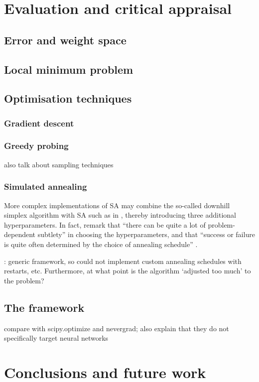 \chapter{Evaluation and critical appraisal}

\section{Error and weight space}

\section{Local minimum problem}

\section{Optimisation techniques}
\subsection{Gradient descent}
\subsection{Greedy probing}
also talk about sampling techniques
\subsection{Simulated annealing}
\label{sec:eval_sim_annealing}
More complex implementations of SA may combine the so-called downhill simplex algorithm \cite{nelder1965} with SA such as in \textcite[p. 444-455]{press1992}, thereby introducing three additional hyperparameters.
In fact, \citeauthor{press1992} remark that ``there can be quite a lot of problem-dependent subtlety'' in choosing the hyperparameters, and that ``success or failure is quite often determined by the choice of annealing schedule'' \cite*[p. 452]{press1992}.

\todo: generic framework, so could not implement custom annealing schedules with restarts, etc.
Furthermore, at what point is the algorithm `adjusted too much' to the problem?

\section{The framework}
compare with scipy.optimize and nevergrad; also explain that they do not specifically target neural networks

\chapter{Conclusions and future work}